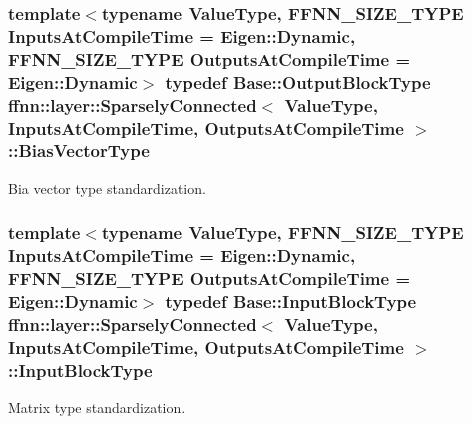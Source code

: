 \hypertarget{classffnn_1_1layer_1_1_sparsely_connected_ad2d566cbb6c54c8723d79737075b4a00}{
\subsubsection[{Bias\-Vector\-Type}]{\setlength{\rightskip}{0pt plus 5cm}template$<$typename Value\-Type, F\-F\-N\-N\-\_\-\-S\-I\-Z\-E\-\_\-\-T\-Y\-P\-E Inputs\-At\-Compile\-Time = Eigen\-::\-Dynamic, F\-F\-N\-N\-\_\-\-S\-I\-Z\-E\-\_\-\-T\-Y\-P\-E Outputs\-At\-Compile\-Time = Eigen\-::\-Dynamic$>$ typedef {\bf Base\-::\-Output\-Block\-Type} {\bf ffnn\-::layer\-::\-Sparsely\-Connected}$<$ Value\-Type, Inputs\-At\-Compile\-Time, Outputs\-At\-Compile\-Time $>$\-::{\bf Bias\-Vector\-Type}}}\label{classffnn_1_1layer_1_1_sparsely_connected_ad2d566cbb6c54c8723d79737075b4a00}


Bia vector type standardization. 

\hypertarget{classffnn_1_1layer_1_1_sparsely_connected_ad90fd9b4c687e4dc515cf8ca2796043c}{
\subsubsection[{Input\-Block\-Type}]{\setlength{\rightskip}{0pt plus 5cm}template$<$typename Value\-Type, F\-F\-N\-N\-\_\-\-S\-I\-Z\-E\-\_\-\-T\-Y\-P\-E Inputs\-At\-Compile\-Time = Eigen\-::\-Dynamic, F\-F\-N\-N\-\_\-\-S\-I\-Z\-E\-\_\-\-T\-Y\-P\-E Outputs\-At\-Compile\-Time = Eigen\-::\-Dynamic$>$ typedef {\bf Base\-::\-Input\-Block\-Type} {\bf ffnn\-::layer\-::\-Sparsely\-Connected}$<$ Value\-Type, Inputs\-At\-Compile\-Time, Outputs\-At\-Compile\-Time $>$\-::{\bf Input\-Block\-Type}}}\label{classffnn_1_1layer_1_1_sparsely_connected_ad90fd9b4c687e4dc515cf8ca2796043c}


Matrix type standardization. 

